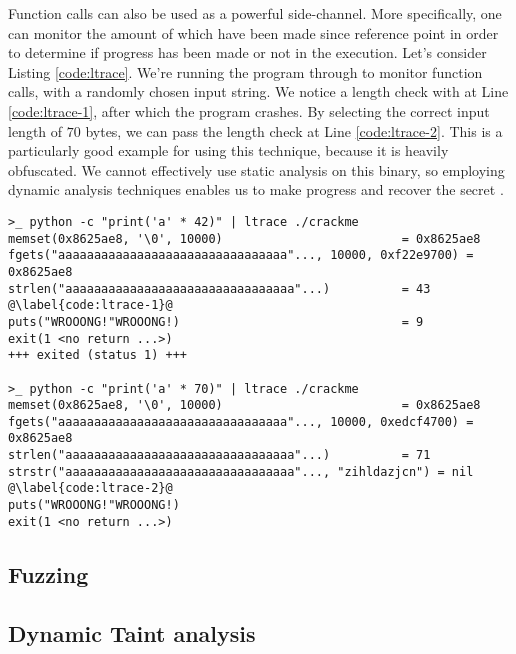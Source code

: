Function calls can also be used as a powerful side-channel. More specifically, one can monitor the amount of  which have been made since reference point in order to determine if progress has been made or not in the execution. Let's consider Listing \ref{code:ltrace}. We're running the  program through  to monitor function calls, with a randomly chosen input string. We notice a length check with  at Line \ref{code:ltrace-1}, after which the program crashes. By selecting the correct input length of $70$ bytes, we can pass the length check at Line \ref{code:ltrace-2}. This  is a particularly good example for using this technique, because it is heavily obfuscated. We cannot effectively use static analysis on this binary, so employing dynamic analysis techniques enables us to make progress and recover the secret \cite{crusu_relabs}.


\begin{lstlisting}[caption={TODO}, label={code:ltrace}]
>_ python -c "print('a' * 42)" | ltrace ./crackme
memset(0x8625ae8, '\0', 10000)                         = 0x8625ae8
fgets("aaaaaaaaaaaaaaaaaaaaaaaaaaaaaaaa"..., 10000, 0xf22e9700) = 0x8625ae8
strlen("aaaaaaaaaaaaaaaaaaaaaaaaaaaaaaaa"...)          = 43 @\label{code:ltrace-1}@
puts("WROOONG!"WROOONG!)                               = 9
exit(1 <no return ...>)
+++ exited (status 1) +++

>_ python -c "print('a' * 70)" | ltrace ./crackme
memset(0x8625ae8, '\0', 10000)                         = 0x8625ae8
fgets("aaaaaaaaaaaaaaaaaaaaaaaaaaaaaaaa"..., 10000, 0xedcf4700) = 0x8625ae8
strlen("aaaaaaaaaaaaaaaaaaaaaaaaaaaaaaaa"...)          = 71
strstr("aaaaaaaaaaaaaaaaaaaaaaaaaaaaaaaa"..., "zihldazjcn") = nil @\label{code:ltrace-2}@
puts("WROOONG!"WROOONG!)
exit(1 <no return ...>)
\end{lstlisting}

\subsection{Fuzzing}

\subsection{Dynamic Taint analysis}

